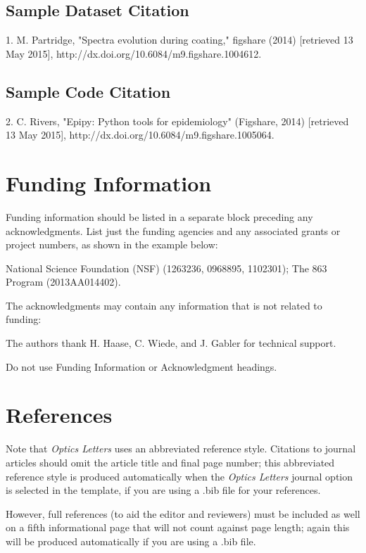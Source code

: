 \documentclass[9pt,twocolumn,twoside]{osajnl}
\begin{document}
\subsection{Sample Dataset Citation}

1. M. Partridge, "Spectra evolution during coating," figshare (2014) [retrieved 13 May 2015], http://dx.doi.org/10.6084/m9.figshare.1004612.

\subsection{Sample Code Citation}

2. C. Rivers, "Epipy: Python tools for epidemiology" (Figshare, 2014) [retrieved 13 May 2015], http://dx.doi.org/10.6084/m9.figshare.1005064.

\section{Funding Information}

Funding information should be listed in a separate block preceding any acknowledgments. List just the funding agencies and any associated grants or project numbers, as shown in the example below:

National Science Foundation (NSF) (1263236, 0968895, 1102301); The 863 Program (2013AA014402).

The acknowledgments may contain any information that is not related to funding:

The authors thank H. Haase, C. Wiede, and J. Gabler for technical support.

Do not use Funding Information or Acknowledgment headings.

\section{References}

Note that \emph{Optics Letters} uses an abbreviated reference style. Citations to journal articles should omit the article title and final page number; this abbreviated reference style is produced automatically when the \emph{Optics Letters} journal option is selected in the template, if you are using a .bib file for your references.

However, full references (to aid the editor and reviewers) must be included as well on a fifth informational page that will not count against page length; again this will be produced automatically if you are using a .bib file.
\end{document}
